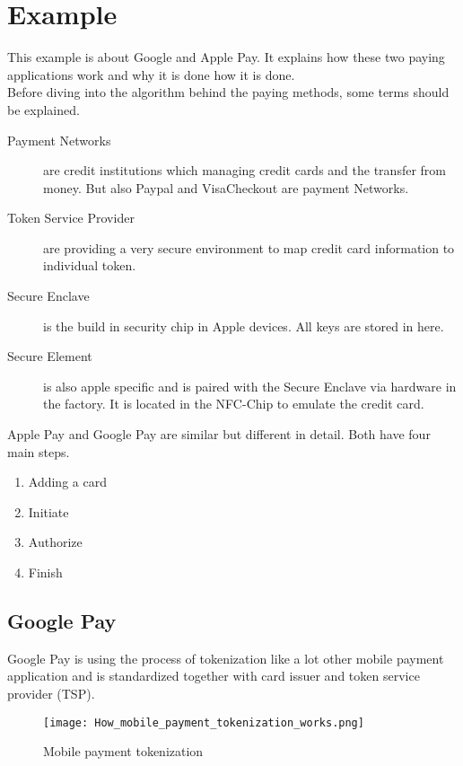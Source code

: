 \chapter{Example}
\label{chp:example}

This example is about Google and Apple Pay. It explains how these two paying applications work and why it is done how it is done. \\
Before diving into the algorithm behind the paying methods, some terms should be explained.

\begin{description}
	\item [Payment Networks] are credit institutions which managing credit cards and the transfer from money. But also Paypal and VisaCheckout are payment Networks.
	\item [Token Service Provider] are providing a very secure environment to map credit card information to individual token. \cite{token-service-provider}
	\item [Secure Enclave] is the build in security chip in Apple devices. All keys are stored in here.
	\item [Secure Element] is also apple specific and is paired with the Secure Enclave via hardware in the factory. It is located in the NFC-Chip to emulate the credit card.
\end{description}

Apple Pay and Google Pay are similar but different in detail. Both have four main steps.

\begin{enumerate}
	\item Adding a card
	\item Initiate
	\item Authorize
	\item Finish
\end{enumerate}

\newpage

\section{Google Pay}
\label{chp:example:sec:googlePay}

Google Pay is using the process of tokenization \cite{tokenization} like a lot other mobile payment application and is standardized together with card issuer and token service provider (TSP).\\
\begin{figure}[h!]
	\texttt{[image: How\_mobile\_payment\_tokenization\_works.png]}
	\caption{Mobile payment tokenization}
	\label{img:mobile_payment_tokenization}
\end{figure}

